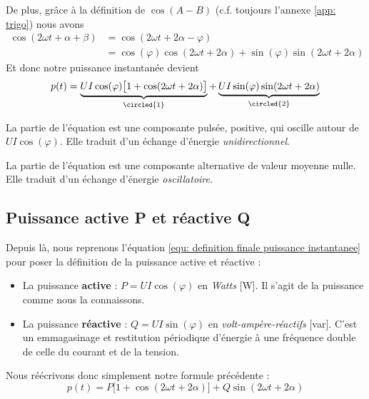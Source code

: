 \documentclass[12pt,a4paper]{article}
\begin{document}
De plus, grâce à la définition de $\cos(A - B)$ (c.f. toujours l'annexe \ref{app: trigo}) nous avons 
\[\begin{array}{ll}
	\cos(2\omega t + \alpha + \beta) & = \cos(2\omega t + 2 \alpha - \varphi)\\
		& =\cos(\varphi)\cos(2\omega t + 2\alpha) + \sin(\varphi)\sin(2\omega t + 2\alpha)
\end{array}\]
Et donc notre puissance instantanée devient
\begin{equation}
	p(t) = \underbrace{UI\cos(\varphi)\big[1 + \cos(2 \omega t + 2\alpha)\big]}_{\circled{1}} + \underbrace{UI \sin(\varphi)\sin(2\omega t + 2\alpha)}_{\circled{2}}
	\label{equ: definition finale puissance instantanee}
\end{equation}

La partie  de l'équation est une composante pulsée, positive, qui oscille autour de $UI\cos(\varphi)$. Elle traduit d'un échange d'énergie \textit{unidirectionnel}.

La partie  de l'équation est une composante alternative de valeur moyenne nulle. Elle traduit d'un échange d'énergie \textit{oscillatoire}.
\subsection{Puissance active P et réactive Q}
Depuis là, nous reprenons l'équation \ref{equ: definition finale puissance instantanee} pour poser la définition de la puissance active et réactive : 
\begin{itemize}
	\item 	La puissance \textbf{active} : $P = UI \cos(\varphi)$ en \textit{Watts} [W]. Il s'agit de la puissance comme nous la connaissons.
	\item 	La puissance \textbf{réactive} : $Q = UI\sin(\varphi)$ en \textit{volt-ampère-réactifs} [var]. C'est un emmagasinage  et restitution périodique d'énergie à une fréquence double de celle du courant et de la tension.
\end{itemize}
Nous réécrivons donc simplement notre formule précédente :
\begin{equation}
	p(t) = P\big[1+\cos(2\omega t + 2\alpha)\big] + Q\sin(2\omega t + 2 \alpha)
\end{equation}
\end{document}
